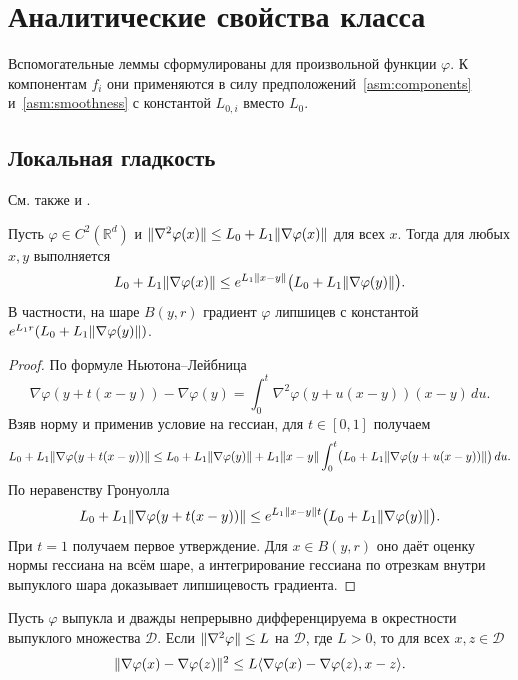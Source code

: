 \section{Аналитические свойства класса}\label{sec:analytic-tools}

Вспомогательные леммы сформулированы для произвольной функции $\varphi$.
К компонентам $f_i$ они применяются в силу предположений~\ref{asm:components}
и~\ref{asm:smoothness} с константой $L_{0,i}$ вместо $L_0$.

\subsection{Локальная гладкость}

См. также \citet[лемма~A.1]{rudomanov2026everest}
и \citet[лемма~2.5]{vankov2025optimizing}.

\begin{lemma}\label{lem:local-transfer}
Пусть $\varphi\in C^2(\mathbb R^d)$ и
$\lVert\nabla^2\varphi(x)\rVert\le L_0+L_1\lVert\nabla\varphi(x)\rVert$
для всех $x$. Тогда для любых $x,y$ выполняется
\begin{equation}\label{eq:local-transfer}
 L_0+L_1\lVert\nabla\varphi(x)\rVert
 \le e^{L_1\lVert x-y\rVert}
       \bigl(L_0+L_1\lVert\nabla\varphi(y)\rVert\bigr).
\end{equation}
В частности, на шаре $B(y,r)$ градиент $\varphi$ липшицев с константой
$e^{L_1r}(L_0+L_1\lVert\nabla\varphi(y)\rVert)$.
\end{lemma}

\begin{proof}
По формуле Ньютона--Лейбница
\[
 \nabla\varphi(y+t(x-y))-\nabla\varphi(y)
 =\int_0^t\nabla^2\varphi(y+u(x-y))(x-y)\,du.
\]
Взяв норму и применив условие на гессиан, для $t\in[0,1]$ получаем
\[
 L_0+L_1\lVert\nabla\varphi(y+t(x-y))\rVert
 \le L_0+L_1\lVert\nabla\varphi(y)\rVert
 +L_1\lVert x-y\rVert\int_0^t\bigl(L_0+L_1\lVert\nabla\varphi(y+u(x-y))\rVert\bigr)\,du.
\]
По неравенству Гронуолла
\[
 L_0+L_1\lVert\nabla\varphi(y+t(x-y))\rVert
 \le e^{L_1\lVert x-y\rVert t}\bigl(L_0+L_1\lVert\nabla\varphi(y)\rVert\bigr).
\]
При $t=1$ получаем первое утверждение. Для $x\in B(y,r)$ оно даёт оценку
нормы гессиана на всём шаре, а интегрирование гессиана по отрезкам
внутри выпуклого шара доказывает липшицевость градиента.
\end{proof}

\citep[Теорема Байона--Хаддада,][]{bauschke2010}

\begin{lemma}\label{lem:local-cocoercivity}
Пусть $\varphi$ выпукла и дважды непрерывно дифференцируема
в окрестности выпуклого множества $\mathcal D$. Если
$\lVert\nabla^2\varphi\rVert\le L$ на $\mathcal D$, где $L>0$, то для всех
$x,z\in\mathcal D$
\[
 \lVert\nabla\varphi(x)-\nabla\varphi(z)\rVert^2
 \le L\langle \nabla\varphi(x)-\nabla\varphi(z),x-z\rangle.
\]
\end{lemma}

